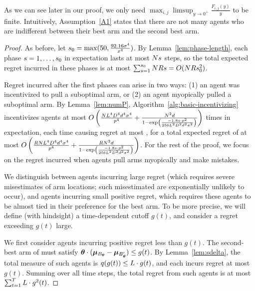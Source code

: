 As we can see later in our proof, we only need
$\max_{i,j}\limsup_{y\rightarrow 0^{+}}\frac{F_{i,j}(y)}{y}$ to be
finite.
Intuitively, Assumption~\ref{A1} states that there are not many agents
who are indifferent between their best arm and the second best arm.


\begin{proof}
As before, let $s_0 = \max (50, \frac{92.16 \sigma^4}{x^4})$.
By Lemma~\ref{lem:phase-length}, each phase $s = 1, \ldots, s_0$
in expectation lasts at most $N s$ steps,
so the total expected regret incurred in these phases is at most
$\sum_{s=1}^{s_0} N R s = O(N R s_0^2)$.

Regret incurred after the first \LatePhase phases can arise in two ways:
(1) an agent was incentivized to pull a suboptimal arm, or
(2) an agent myopically pulled a suboptimal arm.
By Lemma~\ref{lem:numP}, Algorithm~\ref{alg:basic-incentivizing}
incentivizes agents at most 
$O \left( \frac{N L^4 D^4 d^4 \sigma^4}{p^4}
  + \frac{N^2 d}{1 - \exp \left(
    \frac{-1.8 s \cdot p^2}{256 L^2 D^2 d^2 \sigma^2}
  \right)} \right)$
times in expectation, each time causing regret at most \MAXR,
for a total expected regret of at most
$O \left( \frac{R N L^4 D^4 d^4 \sigma^4}{p^4}
  + \frac{R N^2 d}{1 - \exp \left(
    \frac{-1.8 s \cdot p^2}{256 L^2 D^2 d^2 \sigma^2}
  \right)} \right)$.
For the rest of the proof, we focus on the regret incurred when agents
pull arms myopically and make mistakes.

We distinguish between agents incurring large regret
(which requires severe misestimates of arm locations;
such misestimated are exponentially unlikely to occur), 
and agents incurring small positive regret,
which requires these agents to be almost tied in their preference for
the best arm.
To be more precise, we will define (with hindsight) a time-dependent
cutoff $g(t)$, and consider a regret exceeding $g(t)$ large.

We first consider agents \AgV incurring positive regret less than $g(t)$.
The second-best arm \Second{\AgV} of \AgV must satisfy
$\bm{\theta} \cdot (\bm{\mu}_{B_{\bm{\theta}}} - \bm{\mu}_{B'_{\bm{\theta}}}) \leq g(t)$.
By Lemma~\ref{lem:sdelta}, the total measure of such agents
is $q(g(t)) \leq L \cdot g(t)$,
and each incurs regret at most $g(t)$.
Summing over all time steps, the total regret from such agents is at most
$\sum_{t = 1}^T L \cdot g^2(t)$.


\end{proof}
